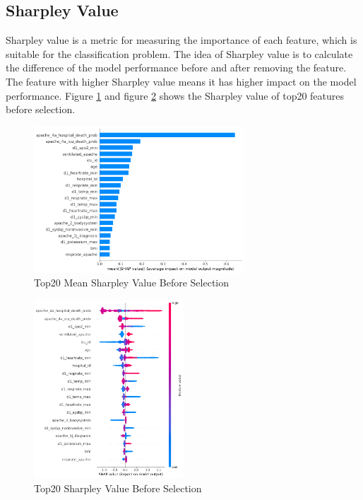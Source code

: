 \documentclass[a4paper, oneside, final, 12pt]{scrartcl} %
\begin{document}
\clearpage

\subsection{Sharpley Value}

Sharpley value is a metric for measuring the importance of each feature,
which is suitable for the classification problem.
The idea of Sharpley value is to calculate the difference of the model performance
before and after removing the feature.
The feature with higher Sharpley value means it has higher impact on the model performance.
Figure \ref{fig:shap_mean_before} and figure \ref{fig:shap_value_before} 
shows the Sharpley value of top20 features before selection.

\begin{figure}[ht]
  \centering
  \includegraphics[width=0.7\textwidth]{"./image/shap_mean_before.png"}
  \caption{Top20 Mean Sharpley Value Before Selection}
  \label{fig:shap_mean_before}
\end{figure}

\begin{figure}[ht]
  \centering
  \includegraphics[width=0.5\textwidth]{"./image/shap_value_before.png"}
  \caption{Top20 Sharpley Value Before Selection}
  \label{fig:shap_value_before}
\end{figure}
\end{document}
